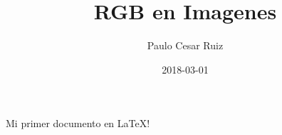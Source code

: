 \documentclass{article}
\title{RGB en Imagenes}
\date{2018-03-01}
\author{Paulo Cesar Ruiz}
\begin{document}
	Mi primer documento en \LaTeX!
\end{document}

